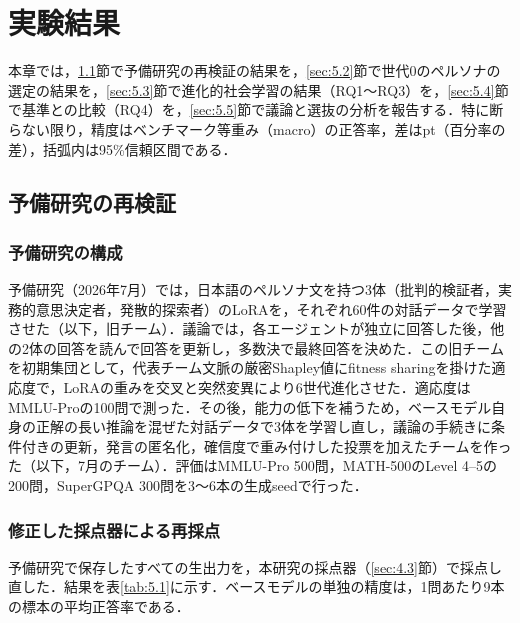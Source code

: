 

\chapter{実験結果}
\label{cha:5}

本章では，\ref{sec:5.1}節で予備研究の再検証の結果を，\ref{sec:5.2}節で世代0のペルソナの選定の結果を，\ref{sec:5.3}節で進化的社会学習の結果（RQ1〜RQ3）を，\ref{sec:5.4}節で基準との比較（RQ4）を，\ref{sec:5.5}節で議論と選抜の分析を報告する．特に断らない限り，精度はベンチマーク等重み（macro）の正答率，差はpt（百分率の差），括弧内は95\%信頼区間である．

\section{予備研究の再検証}
\label{sec:5.1}

\subsection{予備研究の構成}
\label{sec:5.1.1}

予備研究（2026年7月）では，日本語のペルソナ文を持つ3体（批判的検証者，実務的意思決定者，発散的探索者）のLoRAを，それぞれ60件の対話データで学習させた（以下，旧チーム）．議論では，各エージェントが独立に回答した後，他の2体の回答を読んで回答を更新し，多数決で最終回答を決めた．この旧チームを初期集団として，代表チーム文脈の厳密Shapley値にfitness sharingを掛けた適応度で，LoRAの重みを交叉と突然変異により6世代進化させた．適応度はMMLU-Proの100問で測った．その後，能力の低下を補うため，ベースモデル自身の正解の長い推論を混ぜた対話データで3体を学習し直し，議論の手続きに条件付きの更新，発言の匿名化，確信度で重み付けした投票を加えたチームを作った（以下，7月のチーム）．評価はMMLU-Pro 500問，MATH-500のLevel 4--5の200問，SuperGPQA 300問を3〜6本の生成seedで行った．

\subsection{修正した採点器による再採点}
\label{sec:5.1.2}

予備研究で保存したすべての生出力を，本研究の採点器（\ref{sec:4.3}節）で採点し直した．結果を表\ref{tab:5.1}に示す．ベースモデルの単独の精度は，1問あたり9本の標本の平均正答率である．

